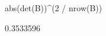 \begin{Schunk}
\begin{Sinput}
 abs(det(B))^(2 / nrow(B))
\end{Sinput}
\begin{Soutput}
[1] 0.3533596
\end{Soutput}
\end{Schunk}
